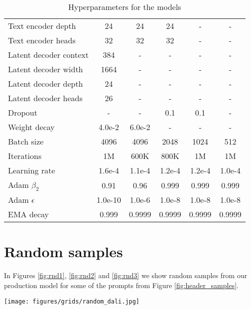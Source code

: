 \documentclass{article}
\newcommand{\modelname}{unCLIP}
\begin{document}
\begin{table}[h]
\begin{center}
\begin{small}
\begin{tabular}{lccccc}
    Text encoder depth      & 24        & 24      & 24      & -       & - \\ 
    Text encoder heads      & 32        & 32      & 32      & -       & - \\
    Latent decoder context  & 384       & -       & -       & -       & - \\
    Latent decoder width    & 1664      & -       & -       & -       & - \\
    Latent decoder depth    & 24        & -       & -       & -       & - \\ 
    Latent decoder heads    & 26        & -       & -       & -       & - \\
    Dropout              & -         & -       & 0.1     & 0.1     & - \\
    Weight decay         & 4.0e-2    & 6.0e-2  & -       & -       & - \\
    Batch size           & 4096      & 4096    & 2048    & 1024    & 512 \\
    Iterations           & 1M        & 600K    & 800K    & 1M      & 1M \\
    Learning rate        & 1.6e-4    & 1.1e-4  & 1.2e-4  & 1.2e-4  & 1.0e-4 \\
    Adam $\beta_2$       & 0.91      & 0.96    & 0.999   & 0.999   & 0.999 \\
    Adam $\epsilon$      & 1.0e-10     & 1.0e-6   & 1.0e-8    & 1.0e-8    & 1.0e-8  \\
    EMA decay            & 0.999     & 0.9999  & 0.9999  & 0.9999  & 0.9999 \\
    \bottomrule
    \end{tabular}
    \end{small}
    \end{center}
    \caption{Hyperparameters for the models}
    \label{tab:hps}
    \vskip -0.2in
\end{table}

\clearpage
\section{Random samples}
In Figures \ref{fig:rnd1}, \ref{fig:rnd2} and \ref{fig:rnd3} we show random samples from our production model for some of the prompts from Figure \ref{fig:header_samples}. 

\begin{figure*}[h]
    \begin{center}
    \texttt{[image: figures/grids/random\_dali.jpg]}
    \end{center}
    \caption{Random samples from \modelname{} for prompt ``Vibrant portrait painting of Salvador Dali with a robotic half face''}
    \label{fig:rnd1} 
    \vskip -0.1in
\end{figure*}
\end{document}
